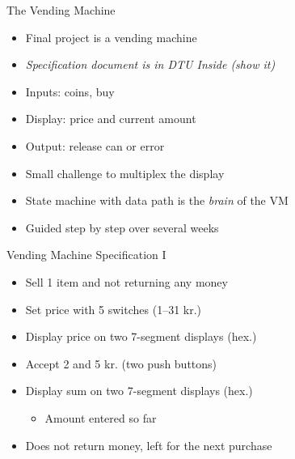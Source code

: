 \begin{frame}[fragile]{The Vending Machine}
\begin{itemize}
\item Final project is a vending machine
\item \emph{Specification document is in DTU Inside (show it)}
\item Inputs: coins, buy
\item Display: price and current amount
\item Output: release can or error
\item Small challenge to multiplex the display
\item State machine with data path is the \emph{brain} of the VM
\item Guided step by step over several weeks
\end{itemize}
\end{frame}

\begin{frame}[fragile]{Vending Machine Specification I}
\begin{itemize}
\item Sell 1 item and not returning any money
\item Set price with 5 switches (1--31 kr.)
\item Display price on two 7-segment displays (hex.)
\item Accept 2 and 5 kr. (two push buttons)
\item Display sum on two 7-segment displays (hex.)
\begin{itemize}
\item Amount entered so far
\end{itemize}
\item Does not return money, left for the next purchase
\end{itemize}
\end{frame}


